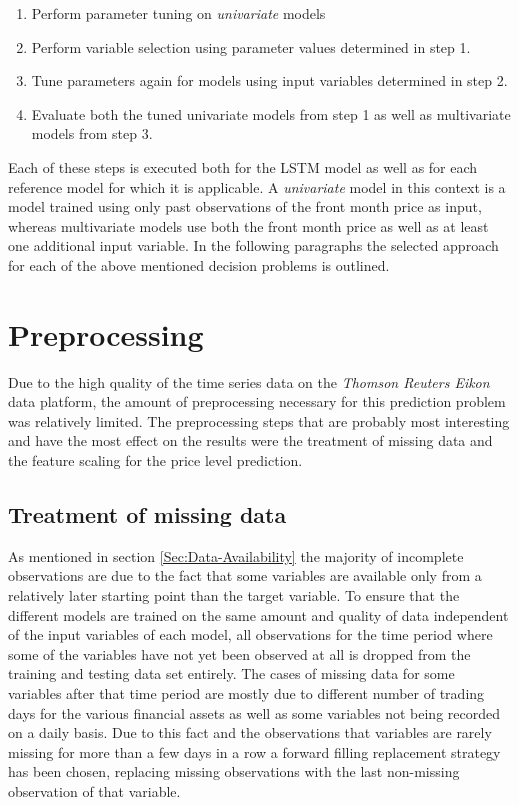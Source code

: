 \begin{enumerate}
\item Perform parameter tuning on \textit{univariate} models
\item Perform variable selection using parameter values determined in step 1.
\item Tune parameters again for models using input variables determined in step 2.
\item Evaluate both the tuned univariate models from step 1 as well as multivariate models from step 3. 
\end{enumerate}
Each of these steps is executed both for the LSTM model as well as for each reference model for which it is applicable.
A \textit{univariate} model in this context is a model trained using only past observations of the front month price as input, whereas multivariate models use both the front month price as well as at least one additional input variable. In the following paragraphs the selected approach for each of the above mentioned decision problems is outlined.

\section{Preprocessing}
Due to the high quality of the time series data on the \textit{Thomson Reuters Eikon} data platform, the amount of preprocessing necessary for this prediction problem was relatively limited. The preprocessing steps that are probably most interesting and have the most effect on the results were the treatment of missing data and the feature scaling for the price level prediction.
\subsection{Treatment of missing data}
As mentioned in section \ref{Sec:Data-Availability} the majority of incomplete observations are due to the fact that some variables are available only from a relatively later starting point than the target variable. To ensure that the different models are trained on the same amount and quality of data independent of the input variables of each model, all observations for the time period where some of the variables have not yet been observed at all is dropped from the training and testing data set entirely. The cases of missing data for some variables after that time period are mostly due to different number of trading days for the various financial assets as well as some variables not being recorded on a daily basis. Due to this fact and the observations that variables are rarely missing for more than a few days in a row a forward filling replacement strategy has been chosen, replacing missing observations with the last non-missing observation of that variable.
